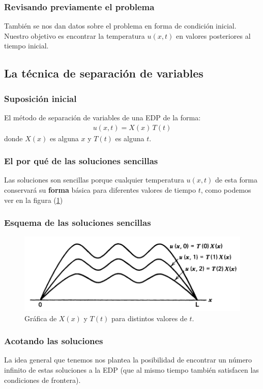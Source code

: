\documentclass[12pt]{beamer}
\begin{document}
\begin{frame}
\frametitle{Revisando previamente el problema}
También se nos dan datos sobre el problema en forma de condición inicial.
\\
\bigskip
\pause
Nuestro objetivo es encontrar la temperatura $u (x, t)$ en valores posteriores al tiempo inicial.
\end{frame}

\subsection{La técnica de separación de variables}

\begin{frame}
\frametitle{Suposición inicial}
El método de separación de variables  de una EDP de la forma:
\pause
\begin{align*}
u (x, t) =  X (x) \, T (t)
\end{align*}
\pause
donde $X (x)$ es alguna  $x$ \pause y $T (t)$ es alguna  $t$.
\end{frame}
\begin{frame}
\frametitle{El por qué de las soluciones sencillas}
Las soluciones son sencillas porque cualquier temperatura $u (x, t)$ de esta forma conservará su \textbf{forma} básica para diferentes valores de tiempo $t$, como podemos ver en la figura (\ref{fig:figura_separacion_variables_01})
\end{frame}
\begin{frame}
\frametitle{Esquema de las soluciones sencillas}
\begin{figure}[H]
    \centering
    \includegraphics[scale=0.35]{Imagenes/Separacion_Variables_01.png}
    \caption{Gráfica de $X (x)$ y $T (t)$ para distintos valores de $t$.}
    \label{fig:figura_separacion_variables_01}
\end{figure}
\end{frame}
\begin{frame}
\frametitle{Acotando las soluciones}
La idea general que tenemos nos plantea la posibilidad de encontrar un número infinito de estas soluciones a la EDP (que al mismo tiempo también satisfacen las condiciones de frontera).
\end{frame}
\end{document}
